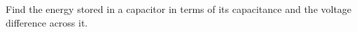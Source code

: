         Find the energy stored in a capacitor in terms of its
        capacitance and the voltage difference across it.\answercheck
